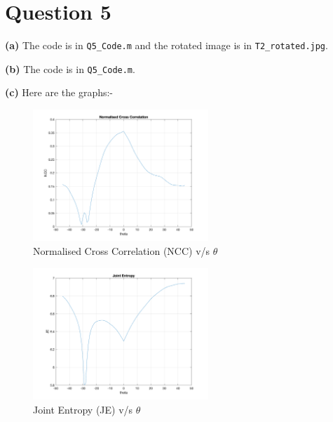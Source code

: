 \documentclass[12pt]{article}
\begin{document}
\section*{Question 5}

\vspace{-10pt}

\textbf{(a)} The code is in \texttt{Q5\_Code.m} and the rotated image is in \texttt{T2\_rotated.jpg}.

\textbf{(b)} The code is in \texttt{Q5\_Code.m}.

\textbf{(c)} Here are the graphs:-

\vspace{-13pt}

\begin{figure}[H]
    \centering
    \includegraphics[width=0.59\textwidth]{NCC.png}
    \vspace{-10pt}
    \caption{Normalised Cross Correlation (NCC) v/s $\theta$}
\end{figure}

\vspace{-25pt}

\begin{figure}[H]
    \centering
    \includegraphics[width=0.59\textwidth]{JE.png}
    \vspace{-10pt}
    \caption{Joint Entropy (JE) v/s $\theta$}
\end{figure}
\end{document}
